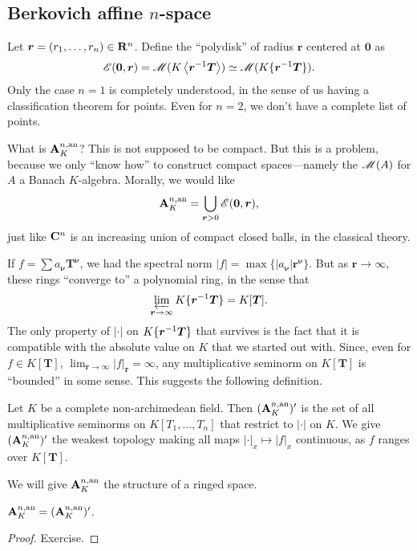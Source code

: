 \subsection{Berkovich affine \texorpdfstring{$n$}{n}-space}

Let $\bm r=(r_1,\dots,r_n)\in \mathbf{R}^n$. Define the ``polydisk'' of radius $\bm r$ 
centered at $\bm 0$ as 
\[
	\mathscr{E}(\bm 0,\bm r) = \operatorname{\mathscr{M}}(K\left\langle \bm r^{-1} \bm T \right\rangle)\simeq \operatorname{\mathscr{M}}(K\{ \bm r^{-1} \bm T \}) .
\]
Only the case $n=1$ is completely understood, in the sense of us having a 
classification theorem for points. Even for $n=2$, we don't have a complete 
list of points. 

What is $\mathbf{A}_K^{n,\mathrm{an}}$? This is not supposed to be compact. But this is a 
problem, because we only ``know how'' to construct compact spaces---namely the 
$\operatorname{\mathscr{M}}(A)$ for $A$ a Banach $K$-algebra. Morally, we would like 
\[
	\mathbf{A}_K^{n,\mathrm{an}} = \bigcup_{\bm r>0} \mathscr{E}(\bm 0,\bm r) ,
\]
just like $\mathbf{C}^n$ is an increasing union of compact closed balls, in the 
classical theory. 

If $f=\sum a_{\bm \nu} \bm T^{\bm \nu}$, we had the spectral norm 
$|f| = \max\{|a_{\bm\nu}|\bm r^{\bm\nu}\}$. But as $\bm r\to \infty$, these 
rings ``converge to'' a polynomial ring, in the sense that 
\[
	\varprojlim_{\bm r\to \infty} K\{ \bm r^{-1} \bm T \} = K[\bm T] .
\]
The only property of $|\cdot|$ on $K\{ \bm r^{-1} \bm T \}$ that survives is 
the fact that it is compatible with the absolute value on $K$ that we started 
out with. Since, even for $f\in K[\bm T]$, 
$\lim_{\bm r\to \infty} |f|_{\bm r}=\infty$, any multiplicative seminorm on 
$K[\bm T]$ is ``bounded'' in some sense. This suggests the following 
definition. 

\begin{definition}
Let $K$ be a complete non-archimedean field. Then $(\mathbf{A}_K^{n,\mathrm{an}})'$ is the set 
of all multiplicative seminorms on $K[T_1,\dots,T_n]$ that restrict to 
$|\cdot|$ on $K$. We give $(\mathbf{A}_K^{n,\mathrm{an}})'$ the weakest topology making all 
maps $|\cdot|_x\mapsto |f|_x$ continuous, as $f$ ranges over $K[\bm T]$. 
\end{definition}

We will give $\mathbf{A}_K^{n,\mathrm{an}}$ the structure of a ringed space. 

\begin{theorem}
$\mathbf{A}_K^{n,\mathrm{an}} = (\mathbf{A}_K^{n,\mathrm{an}})'$. 
\end{theorem}
\begin{proof}
Exercise. 
\end{proof}

